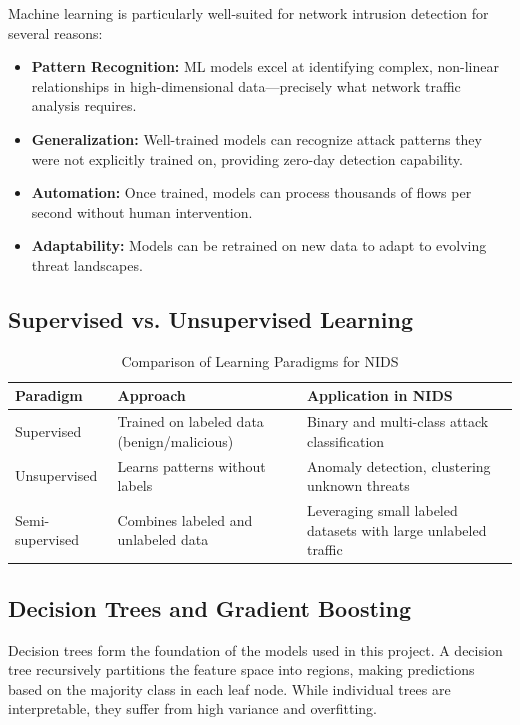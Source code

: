 \documentclass[12pt,a4paper,twoside]{report}
\begin{document}
Machine learning is particularly well-suited for network intrusion detection for several reasons:

\begin{itemize}
    \item \textbf{Pattern Recognition:} ML models excel at identifying complex, non-linear relationships in high-dimensional data—precisely what network traffic analysis requires.
    \item \textbf{Generalization:} Well-trained models can recognize attack patterns they were not explicitly trained on, providing zero-day detection capability.
    \item \textbf{Automation:} Once trained, models can process thousands of flows per second without human intervention.
    \item \textbf{Adaptability:} Models can be retrained on new data to adapt to evolving threat landscapes.
\end{itemize}

\subsection{Supervised vs. Unsupervised Learning}

\begin{table}[H]
\centering
\caption{Comparison of Learning Paradigms for NIDS}
\begin{tabularx}{\textwidth}{lXX}
\toprule
\textbf{Paradigm} & \textbf{Approach} & \textbf{Application in NIDS} \\
\midrule
Supervised & Trained on labeled data (benign/malicious) & Binary and multi-class attack classification \\
Unsupervised & Learns patterns without labels & Anomaly detection, clustering unknown threats \\
Semi-supervised & Combines labeled and unlabeled data & Leveraging small labeled datasets with large unlabeled traffic \\
\bottomrule
\end{tabularx}
\end{table}

\subsection{Decision Trees and Gradient Boosting}

Decision trees form the foundation of the models used in this project. A decision tree recursively partitions the feature space into regions, making predictions based on the majority class in each leaf node. While individual trees are interpretable, they suffer from high variance and overfitting.
\end{document}

